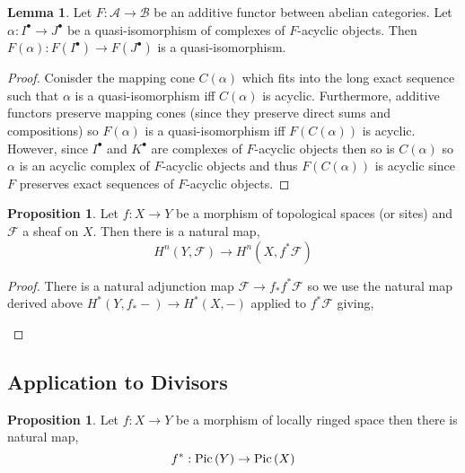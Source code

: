 \documentclass[12pt]{extarticle}
\theoremstyle{definition}
\newtheorem{lemma}[theorem]{Lemma}
\newtheorem{proposition}[theorem]{Proposition}
\newcommand{\F}{\mathcal{F}}
\begin{document}
\begin{lemma}
Let $F : \mathcal{A} \to \mathcal{B}$ be an additive functor between abelian categories. Let $\alpha : I^\bullet \to J^\bullet$ be a quasi-isomorphism of complexes of $F$-acyclic objects. Then $F(\alpha) : F(I^\bullet) \to F(J^\bullet)$ is a quasi-isomorphism. 
\end{lemma}

\begin{proof}
Conisder the mapping cone $C(\alpha)$ which fits into the long exact sequence such that $\alpha$ is a quasi-isomorphism iff $C(\alpha)$ is acyclic. Furthermore, additive functors preserve mapping cones (since they preserve direct sums and compositions) so $F(\alpha)$ is a quasi-isomorphism iff $F(C(\alpha))$ is acyclic. However, since $I^\bullet$ and $K^\bullet$ are complexes of $F$-acyclic objects then so is $C(\alpha)$ so $\alpha$ is an acyclic complex of $F$-acyclic objects and thus $F(C(\alpha))$ is acyclic since $F$ preserves exact sequences of $F$-acyclic objects. 
\end{proof}

\begin{proposition}
Let $f : X \to Y$ be a morphism of topological spaces (or sites) and $\F$ a sheaf on $X$. Then there is a natural map,
\[ H^n(Y, \F) \to H^n(X, f^* \F) \]
\end{proposition}

\begin{proof}
There is a natural adjunction map $\F \to f_* f^* \F$ so we use the natural map derived above $H^*(Y, f_* -) \to H^*(X, - )$ applied to $f^* \F$ giving,
\begin{center}
\end{center}
\end{proof}


\subsection{Application to Divisors}

\renewcommand{\L}{\mathcal{L}}

\begin{proposition}
Let $f : X \to Y$ be a morphism of locally ringed space then there is natural map,
\[ f^* : \mathrm{Pic}\left( Y \right) \to \mathrm{Pic}\left( X \right) \]
\end{proposition}
\end{document}
